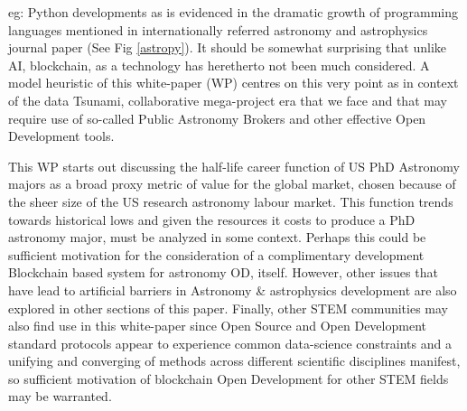 \documentclass[final,5p,times,twocolumn,authoryear]{elsarticle}
\begin{document}
eg: Python developments as is evidenced in the dramatic growth of programming languages mentioned in internationally referred astronomy and astrophysics journal paper (See Fig \ref{astropy}). It should be somewhat surprising that unlike AI, blockchain, as a technology has heretherto not been much considered.  A model heuristic of this white-paper (WP) centres on this very point as in context of the data Tsunami, collaborative mega-project era that we face and that may require use of so-called Public Astronomy Brokers \cite{bellm19} and other effective Open Development tools.  

This WP starts out discussing the half-life career function \cite{milo_2018} of US PhD Astronomy majors as a broad proxy metric of value for the global market, chosen because of the sheer size of the US research astronomy labour market. This function trends towards historical lows and given the resources it costs to produce a PhD astronomy major, must be analyzed in some context. Perhaps this could be sufficient motivation for the consideration of a complimentary development Blockchain based system for astronomy OD, itself. However, other issues that have lead to artificial barriers in Astronomy \& astrophysics development are also explored in other sections of this paper. Finally, other STEM communities may also find use in this white-paper since Open Source and Open Development standard protocols appear to experience common data-science constraints and a unifying and converging of methods across different scientific disciplines manifest, so sufficient motivation of blockchain Open Development for other STEM fields may be warranted. %


\end{document}
